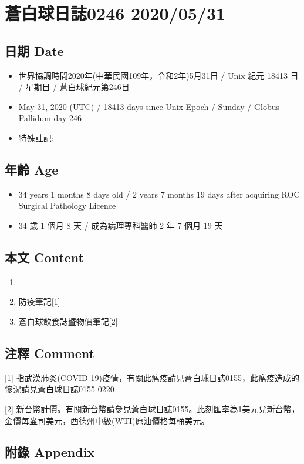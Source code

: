 \documentclass[
]{article}
\providecommand{\tightlist}{%
  \setlength{\itemsep}{0pt}\setlength{\parskip}{0pt}}
\begin{document}
\hypertarget{ux84bcux767dux7403ux65e5ux8a8c0246-20200531}{%
\section{蒼白球日誌0246
2020/05/31}\label{ux84bcux767dux7403ux65e5ux8a8c0246-20200531}}

\hypertarget{ux65e5ux671f-date-30}{%
\subsection{日期 Date}\label{ux65e5ux671f-date-30}}

\begin{itemize}
\tightlist
\item
  世界協調時間2020年(中華民國109年，令和2年)5月31日 / Unix 紀元 18413 日
  / 星期日 / 蒼白球紀元第246日
\item
  May 31, 2020 (UTC) / 18413 days since Unix Epoch / Sunday / Globus
  Pallidum day 246
\item
  特殊註記:
\end{itemize}

\hypertarget{ux5e74ux9f61-age-30}{%
\subsection{年齡 Age}\label{ux5e74ux9f61-age-30}}

\begin{itemize}
\tightlist
\item
  34 years 1 months 8 days old / 2 years 7 months 19 days after
  acquiring ROC Surgical Pathology Licence
\item
  34 歲 1 個月 8 天 / 成為病理專科醫師 2 年 7 個月 19 天
\end{itemize}

\hypertarget{ux672cux6587-content-30}{%
\subsection{本文 Content}\label{ux672cux6587-content-30}}

\begin{enumerate}
\def\labelenumi{\arabic{enumi}.}
\item
\item
  防疫筆記{[}1{]}
\item
  蒼白球飲食誌暨物價筆記{[}2{]}
\end{enumerate}

\hypertarget{ux6ce8ux91cb-comment-30}{%
\subsection{注釋 Comment}\label{ux6ce8ux91cb-comment-30}}

{[}1{]}
指武漢肺炎(COVID-19)疫情，有關此瘟疫請見蒼白球日誌0155，此瘟疫造成的慘況請見蒼白球日誌0155-0220

{[}2{]}
新台幣計價。有關新台幣請參見蒼白球日誌0155。此刻匯率為1美元兌新台幣，金價每盎司美元，西德州中級(WTI)原油價格每桶美元。

\hypertarget{ux9644ux9304-appendix-30}{%
\subsection{附錄 Appendix}\label{ux9644ux9304-appendix-30}}
\end{document}
